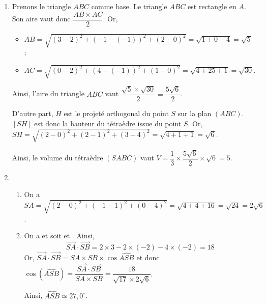 \documentclass[11pt,fleqn, openany]{book} %
\begin{document}
\begin{solution}
\begin{enumerate}
\begin{enumerate}
\[\begin{array}{llll}
\end{array}\right.,t\in\mathbb{R}.\]

\item D'une part, les coordonnées du point $H$ vérifient l'équation du plan $(ABC)$. \\En effet, $2\times 2+2-3-3=0$. D'autre part, en prenant $t=1$, on a bien $2t=2$, $1+t=2$ et $4-t=3$. Le point $H$ appartient donc aussi à la droite $(d)$. Il s'agit donc du point d'intersection de $(d)$ et $(ABC)$.

Il est également possible de remplacer $x$, $y$ et $z$ dans l'équation du plan par $2t$, $1+t$ et $4-t$. On trouve alors $t=1$.
\end{enumerate}

\item Prenons le triangle $ABC$ comme base. Le triangle $ABC$ est rectangle en $A$. Son aire vaut donc $\dfrac{AB \times AC}{2}$. Or,
\begin{itemize}
\item $AB= \sqrt{(3-2)^2+(-1-(-1))^2+(2-0)^2}=\sqrt{1+0+4}=\sqrt{5}$ ;
\item $AC=\sqrt{(0-2)^2+(4-(-1))^2+(1-0)^2}=\sqrt{4+25+1}=\sqrt{30}$.
\end{itemize}
Ainsi, l'aire du triangle $ABC$ vaut $\dfrac{\sqrt{5} \times \sqrt{30}}{2}=\dfrac{5\sqrt{6}}{2}$.

D'autre part, $H$ est le projeté orthogonal du point $S$ sur la plan $(ABC)$. $[SH]$ est donc la hauteur du tétraèdre issue du point $S$. Or, $SH = \sqrt{(2-0)^2+(2-1)^2+(3-4)^2}=\sqrt{4+1+1}=\sqrt{6}$.

Ainsi, le volume du tétraèdre $(SABC)$ vaut $ V = \dfrac{1}{3} \times \dfrac{5\sqrt{6}}{2} \times \sqrt{6} = 5$.
\item \begin{enumerate}
\item On a $ SA = \sqrt{(2-0)^2+(-1-1)^2+(0-4)^2}=\sqrt{4+4+16}=\sqrt{24}=2\sqrt{6}$.

\item On a  et  soit  et . Ainsi, 
\[ \overrightarrow{SA} \cdot \overrightarrow{SB} = 2 \times 3 -2 \times (-2) -4 \times (-2)=18\]
Or, $ \overrightarrow{SA} \cdot \overrightarrow{SB} = SA \times SB \times \cos \widehat{ASB}$ et donc$ \cos(\widehat{ASB})=\dfrac{\overrightarrow{SA} \cdot \overrightarrow{SB}}{SA \times SB}=\dfrac{18}{\sqrt{17}\times2\sqrt{6}}$.

Ainsi, $\widehat{ASB} \simeq 27,0^{\circ}$.

\end{enumerate}\end{enumerate}\end{solution}
\end{document}
